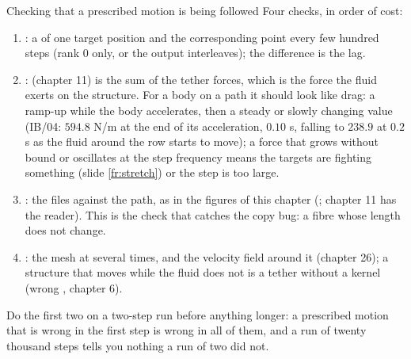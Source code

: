 \documentclass[aspectratio=169,11pt]{beamer}
\begin{document}
\begin{frame}{Checking that a prescribed motion is being followed}
\label{fr:check}
\small Four checks, in order of cost:
\begin{enumerate}\footnotesize
  \item {}: a  of one target position and the corresponding point every few hundred steps (rank 0 only, or the output interleaves); the difference is the lag.
  \item {}:  (chapter 11) is the sum of the tether forces, which is the force the fluid exerts on the structure. For a body on a path it should look like drag: a ramp-up while the body accelerates, then a steady or slowly changing value (IB/04: $594.8$ N/m at the end of its acceleration, $0.10$ s, falling to $238.9$ at $0.2$ s as the fluid around the row starts to move); a force that grows without bound or oscillates at the step frequency means the targets are fighting something (slide \ref{fr:stretch}) or the step is too large.
  \item {}: the  files against the path, as in the figures of this chapter (; chapter 11 has the reader). This is the check that catches the copy bug: a fibre whose length does not change.
  \item {}: the  mesh at several times, and the velocity field around it (chapter 26); a structure that moves while the fluid does not is a tether without a kernel (wrong , chapter 6).
\end{enumerate}
\vspace{1mm}
\begin{punchbox}
\small Do the first two on a two-step run before anything longer: a prescribed motion that is wrong in the first step is wrong in all of them, and a run of twenty thousand steps tells you nothing a run of two did not.
\end{punchbox}
\end{frame}
\end{document}
